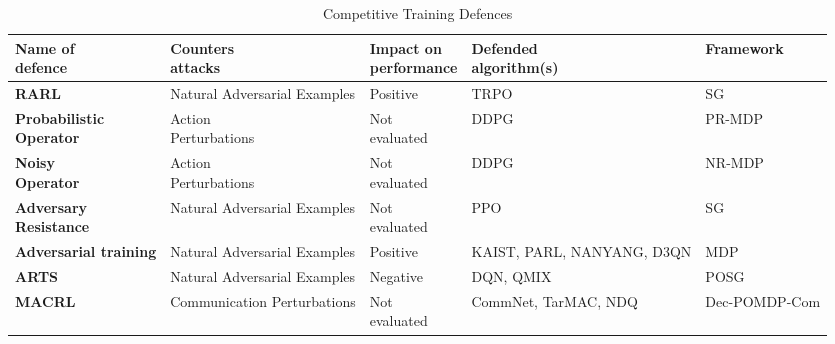\documentclass[conference,compsoc]{IEEEtran}
\begin{document}
\begin{table}[ht]
\centering
\caption{Competitive Training Defences}
\resizebox{\columnwidth}{!}
{
\begin{tabular}{ p{2.1cm} p{2.0cm} p{1.7cm} p{1.4cm} p{1.5cm} } 
\hline
\makecell[lt]{\textbf{Name of} \\ \textbf{defence}} & \makecell[lt]{\textbf{Counters} \\ \textbf{attacks}}  & \makecell[lt]{\textbf{Impact on} \\ \textbf{performance}} & \makecell[lt]{\textbf{Defended} \\ \textbf{algorithm(s)}} & \textbf{Framework}  \\ 
\hline
\textbf{RARL \cite{pinto_robust_2017}}                   & Natural Adversarial Examples & Positive                       & TRPO                       & SG              \\ 
\makecell[lt]{\textbf{Probabilistic} \\ \textbf{Operator \cite{tessler_action_2019}}} & \makecell[lt]{Action \\ Perturbations}         & \makecell[lt]{Not \\ evaluated}                   & DDPG                       & PR-MDP          \\ 
\makecell[lt]{\textbf{Noisy} \\ \textbf{Operator \cite{tessler_action_2019}}}         & \makecell[lt]{Action \\ Perturbations}         & \makecell[lt]{Not \\ evaluated}                   & DDPG                       & NR-MDP          \\ 
\makecell[lt]{\textbf{Adversary} \\ \textbf{Resistance \cite{guo_adversarial_2021}}}   & Natural Adversarial Examples & \makecell[lt]{Not \\ evaluated}                   & PPO                        & SG              \\ 
\textbf{Adversarial training \cite{pan_improving_2021}}   & Natural Adversarial Examples & Positive                       & KAIST, PARL, NANYANG, D3QN & MDP             \\ 
\textbf{ARTS \cite{phan_learning_2020}}                   & Natural Adversarial Examples & Negative                       & DQN, QMIX                  & POSG            \\ 
\textbf{MACRL \cite{xue_mis-spoke_2022}}                  & Communication Perturbations  & \makecell[lt]{Not \\ evaluated}                  & CommNet, TarMAC, NDQ       & Dec-POMDP-Com   \\
\hline
\end{tabular}
}
\label{tab:comp_training}
\end{table}
\end{document}
